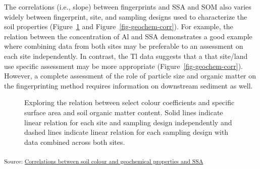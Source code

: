 \documentclass[
  number]{elsarticle}
\begin{document}
The correlations (i.e., slope) between fingerprints and SSA and SOM also
varies widely between fingerprint, site, and sampling designs used to
characterize the soil properties (Figure~\ref{fig-colour-corr} and
Figure~\ref{fig-geochem-corr}). For example, the relation between the
concentration of Al and SSA demonstrates a good example where combining
data from both sites may be preferable to an assessment on each site
independently. In contrast, the Tl data suggests that a that site/land
use specific assessment may be more appropriate
(Figure~\ref{fig-geochem-corr}). However, a complete assessment of the
role of particle size and organic matter on the fingerprinting method
requires information on downstream sediment as well.

\begin{figure}[H]


\caption{\label{fig-colour-corr}Exploring the relation between select
colour coefficients and specific surface area and soil organic matter
content. Solid lines indicate linear relation for each site and sampling
design independently and dashed lines indicate linear relation for each
sampling design with data combined across both sites.}

\end{figure}%

\textsubscript{Source:
\href{https://alex-koiter.github.io/sampling-design-manuscript/notebooks/correlation-preview.html\#cell-fig-colour-corr}{Correlations
between soil colour and geochemical properties and SSA}}
\end{document}
